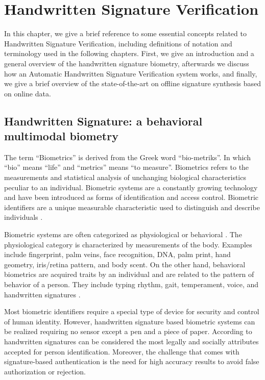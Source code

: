 
\chapter{Handwritten Signature Verification} \label{ch:sig}
In this chapter, we give a brief reference to some essential concepts related to Handwritten Signature Verification, including definitions of notation and terminology used in the following chapters. First, we give an introduction and a general overview of the handwritten signature biometry, afterwards we discuss how an Automatic Handwritten Signature Verification system works, and finally, we give a brief overview of the state-of-the-art on offline signature synthesis based on online data.

\section{Handwritten Signature: a behavioral multimodal biometry}

The term ``Biometrics'' is derived from the Greek word ``bio-metriks''. In which ``bio'' means ``life'' and ``metrics'' means ``to measure''. Biometrics refers to the measurements and statistical analysis of unchanging biological characteristics peculiar to an individual. Biometric systems are
a constantly growing technology \cite{jain2004biometrics} and have been introduced as forms of identification and access control. Biometric identifiers are a unique measurable characteristic used to distinguish and describe individuals \cite{jain2000biometric}. 

Biometric systems are often categorized as physiological or behavioral \cite{ross2008introduction}. The physiological category is characterized by measurements of the body. Examples include fingerprint, palm veins, face recognition, DNA, palm print, hand geometry, iris/retina pattern, and body scent. On the other hand, behavioral biometrics are acquired traits by an individual and are related to the pattern of behavior of a person. They include typing rhythm, gait, temperament, voice, and handwritten signatures \cite{jain2016}.

Most biometric identifiers require a special type of device for security and control of human identity. However, handwritten signature based biometric systems can be realized requiring no sensor except a pen and a piece of paper. According to \cite{pal2014signature} handwritten signatures can be considered the most legally and socially attributes accepted for person identification. Moreover, the challenge that comes with signature-based authentication is the need for high accuracy results to avoid false authorization or rejection.

